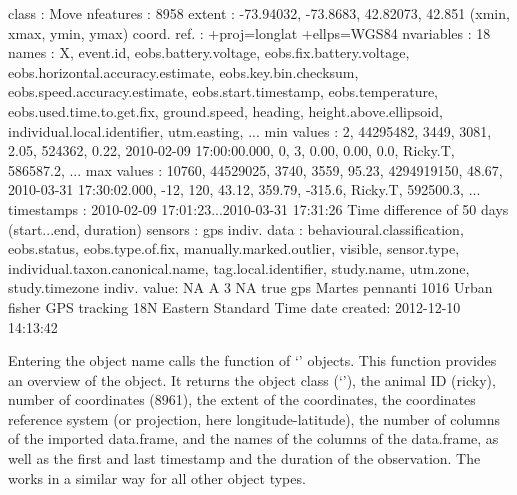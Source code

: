 \documentclass[article,nojss]{jss}
\newcommand{\fct}[1]{{\code{#1()}}}
\newcommand{\class}[1]{{`\code{#1}'}}
\begin{document}
\begin{Schunk}
\begin{Soutput}
class       : Move 
nfeatures   : 8958 
extent      : -73.94032, -73.8683, 42.82073, 42.851  (xmin, xmax, ymin, ymax)
coord. ref. : +proj=longlat +ellps=WGS84 
nvariables  : 18
names       :     X, event.id, eobs.battery.voltage, eobs.fix.battery.voltage, eobs.horizontal.accuracy.estimate, eobs.key.bin.checksum, eobs.speed.accuracy.estimate,    eobs.start.timestamp, eobs.temperature, eobs.used.time.to.get.fix, ground.speed, heading, height.above.ellipsoid, individual.local.identifier, utm.easting, ... 
min values  :     2, 44295482,                 3449,                     3081,                              2.05,                524362,                         0.22, 2010-02-09 17:00:00.000,                0,                         3,         0.00,    0.00,                    0.0,                     Ricky.T,    586587.2, ... 
max values  : 10760, 44529025,                 3740,                     3559,                             95.23,            4294919150,                        48.67, 2010-03-31 17:30:02.000,              -12,                       120,        43.12,  359.79,                 -315.6,                     Ricky.T,    592500.3, ... 
timestamps  : 2010-02-09 17:01:23...2010-03-31 17:31:26 Time difference of 50 days  (start...end, duration) 
sensors     : gps 
indiv. data : behavioural.classification, eobs.status, eobs.type.of.fix, manually.marked.outlier, visible, sensor.type, individual.taxon.canonical.name, tag.local.identifier, study.name, utm.zone, study.timezone 
indiv. value: NA A 3 NA true gps Martes pennanti 1016 Urban fisher GPS tracking 18N Eastern Standard Time 
date created: 2012-12-10 14:13:42 
\end{Soutput}
\end{Schunk}

Entering the object name calls the \fct{show} function of \class{Move} objects. This function provides an overview of the object. It returns the object class (\class{Move}), the animal ID (ricky), number of coordinates (8961), the extent of the coordinates, the coordinates reference system (or projection, here longitude-latitude), the number of columns of the imported data.frame, and the names of the columns of the data.frame, as well as the first and last timestamp and the duration of the observation. The \fct{show} works in a similar way for all other object types.\\
\end{document}
